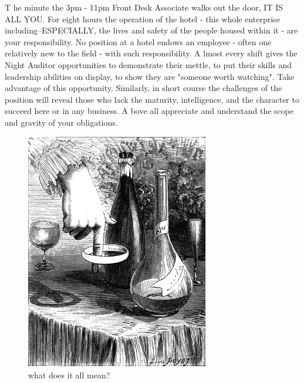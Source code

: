 \renewcommand{\LettrineFontHook}{\usefont{U}{GoudyIn}{xl}{n}\color{red!30!black}}
\lettrine[lines=4,loversize=-0.03, lraise=.03]{T}{}
he minute the 3pm - 11pm Front Desk Associate walks out the door, IT IS ALL YOU. For eight hours the operation of the hotel - this whole enterprise including--ESPECIALLY, the lives and safety of the people housed within it - are your responsibility. No position at a hotel endows an employee - often one relatively new to the field - with such responsibility.
\newline\newline \noindent
\lettrine[lines=3,loversize=-0.03, lraise=.03]{A}{}
lmost every shift gives the Night Auditor opportunities to demonstrate their mettle, to put their skills and leadership abilities on display, to show they are "someone worth watching". Take advantage of this opportunity. Similarly, in short course the challenges of the position will reveal those who lack the maturity, intelligence, and the character to succeed here or in any business.
\newline\newline
\lettrine[lines=2,loversize=-0.03, lraise=0.50]{A}{}
bove all appreciate and understand the scope and gravity of your obligations.
\newpage






\begin{figure}[h]
\centering
\includegraphics[width=80mm]{image/centforce.png}
\caption{what does it all mean?}
\end{figure}


